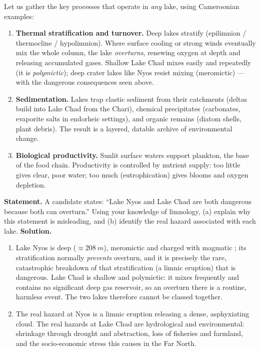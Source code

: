 \documentclass[11pt]{article}
\begin{document}
Let us gather the key processes that operate in \emph{any} lake, using Cameroonian examples:

\begin{enumerate}
\item \textbf{Thermal stratification and turnover.} Deep lakes stratify (epilimnion / thermocline / hypolimnion). Where surface cooling or strong winds eventually mix the whole column, the lake \emph{overturns}, renewing oxygen at depth and releasing accumulated gases. Shallow Lake Chad mixes easily and repeatedly (it is \emph{polymictic}); deep crater lakes like Nyos resist mixing (meromictic) --- with the dangerous consequences seen above.
\item \textbf{Sedimentation.} Lakes trap clastic sediment from their catchments (deltas build into Lake Chad from the Chari), chemical precipitates (carbonates, evaporite salts in endorheic settings), and organic remains (diatom shells, plant debris). The result is a layered, datable archive of environmental change.
\item \textbf{Biological productivity.} Sunlit surface waters support plankton, the base of the food chain. Productivity is controlled by nutrient supply: too little gives clear, poor water; too much (eutrophication) gives blooms and oxygen depletion.
\end{enumerate}

\begin{exoresolu}
\textbf{Statement.} A candidate states: ``Lake Nyos and Lake Chad are both dangerous because both can overturn.'' Using your knowledge of limnology, (a) explain why this statement is misleading, and (b) identify the real hazard associated with each lake.
\tcblower
\textbf{Solution.}
\begin{enumerate}
\item[(a)] Lake Nyos is deep ($\approx\SI{208}{m}$), meromictic and charged with magmatic ; its stratification normally \emph{prevents} overturn, and it is precisely the rare, catastrophic breakdown of that stratification (a limnic eruption) that is dangerous. Lake Chad is shallow and polymictic: it mixes frequently and contains no significant deep gas reservoir, so an overturn there is a routine, harmless event. The two lakes therefore cannot be classed together.
\item[(b)] The real hazard at Nyos is a limnic eruption releasing a dense, asphyxiating  cloud. The real hazards at Lake Chad are hydrological and environmental: shrinkage through drought and abstraction, loss of fisheries and farmland, and the socio-economic stress this causes in the Far North.
\end{enumerate}
\end{exoresolu}
\end{document}
